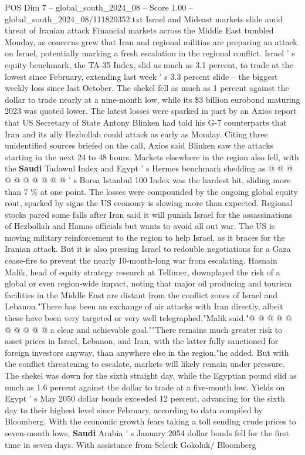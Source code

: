 \begin{textsample}{POS Dim 7 – global\_south\_2024\_08 – Score 1.00 – global\_south\_2024\_08/111820352.txt}  \label{ex:f7_pos_073}
Israel and Mideast markets slide amid threat of Iranian attack Financial markets across the Middle East tumbled Monday, as concerns grew that Iran and regional militias are preparing an attack on Israel, potentially marking a fresh escalation in the regional conflict.
Israel ' s equity benchmark, the TA-35 Index, slid as much as 3.1 percent, to trade at the lowest since February, extending last week ' s 3.3 percent slide -- the biggest weekly loss since last October.
The shekel fell as much as 1 percent against the dollar to trade nearly at a nine-month low, while its \$3 billion eurobond maturing 2023 was quoted lower.
The latest losses were sparked in part by an Axios report that US Secretary of State Antony Blinken had told his G-7 counterparts that Iran and its ally Hezbollah could attack as early as Monday.
Citing three unidentified sources briefed on the call, Axios said Blinken saw the attacks starting in the next 24 to 48 hours.
Markets elsewhere in the region also fell, with the \textbf{Saudi} Tadawul Index and Egypt ' s Hermes benchmark shedding as @ @ @ @ @ @ @ @ @ @ ' s Borsa Istanbul 100 Index was the hardest hit, sliding more than 7 \% at one point.
The losses were compounded by the ongoing global equity rout, sparked by signs the US economy is slowing more than expected.
Regional stocks pared some falls after Iran said it will punish Israel for the assassinations of Hezbollah and Hamas officials but wants to avoid all out war.
The US is moving military reinforcement to the region to help Israel, as it braces for the Iranian attack.
But it is also pressing Israel to redouble negotiations for a Gaza cease-fire to prevent the nearly 10-month-long war from escalating.
Hasnain Malik, head of equity strategy research at Tellimer, downplayed the risk of a global or even region-wide impact, noting that major oil producing and tourism facilities in the Middle East are distant from the conflict zones of Israel and Lebanon."There has been an exchange of air attacks with Iran directly, albeit these have been very targeted or very well telegraphed,"Malik said."@ @ @ @ @ @ @ @ @ @ a clear and achievable goal.""There remains much greater risk to asset prices in Israel, Lebanon, and Iran, with the latter fully sanctioned for foreign investors anyway, than anywhere else in the region,"he added.
But with the conflict threatening to escalate, markets will likely remain under pressure.
The shekel was down for the sixth straight day, while the Egyptian pound slid as much as 1.6 percent against the dollar to trade at a five-month low.
Yields on Egypt ' s May 2050 dollar bonds exceeded 12 percent, advancing for the sixth day to their highest level since February, according to data compiled by Bloomberg.
With the economic growth fears taking a toll sending crude prices to seven-month lows, \textbf{Saudi} Arabia ' s January 2054 dollar bonds fell for the first time in seven days.
With assistance from Selcuk Gokoluk/ Bloomberg

\end{textsample}
